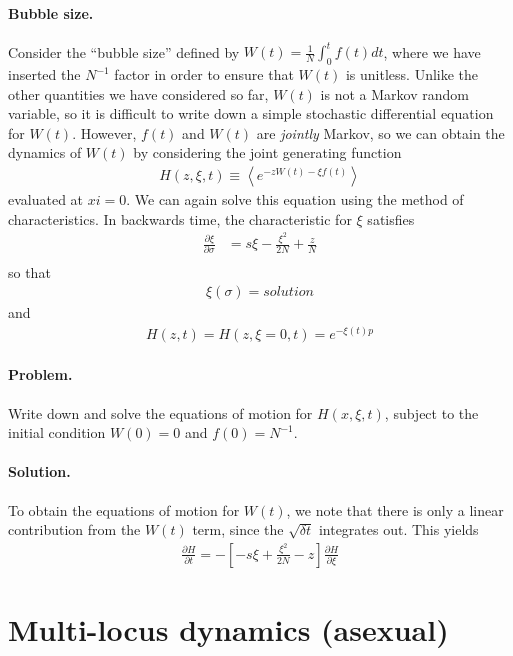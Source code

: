 \documentclass[11pt]{article}
\begin{document}
\paragraph{Bubble size.} Consider the ``bubble size'' defined by $W(t) = \frac{1}{N} \int_0^t f(t) dt$, where we have inserted the $N^{-1}$ factor in order to ensure that $W(t)$ is unitless. Unlike the other quantities we have considered so far, $W(t)$ is not a Markov random variable, so it is difficult to write down a simple stochastic differential equation for $W(t)$. However, $f(t)$ and $W(t)$ are \emph{jointly} Markov, so we can obtain the dynamics of $W(t)$ by considering the joint generating function
\begin{align}
H(z,\xi,t) \equiv \left\langle e^{-z W(t) - \xi f(t)} \right\rangle
\end{align}
evaluated at $xi=0$. We can again solve this equation using the method of characteristics. In backwards time, the characteristic for $\xi$ satisfies
\begin{align}
\frac{\partial \xi}{\partial \sigma} & = s \xi - \frac{\xi^2}{2N} + \frac{z}{N} \\
\end{align} 
so that 
\begin{align}
\xi(\sigma) = solution
\end{align}
and
\begin{align}
H(z,t) = H(z,\xi=0,t) = e^{-\xi(t) p} 
\end{align}


\paragraph{Problem.} Write down and solve the equations of motion for $H(x,\xi,t)$, subject to the initial condition $W(0)=0$ and $f(0)=N^{-1}$. 

\paragraph{Solution.} To obtain the equations of motion for $W(t)$, we note that there is only a linear contribution from the $W(t)$ term, since the $\sqrt{\delta t}$ integrates out. This yields
\begin{align}
\frac{\partial H}{\partial t} = - \left[ - s \xi + \frac{\xi^2}{2N} - z \right] \frac{\partial H}{\partial \xi}  
\end{align}   

\section{Multi-locus dynamics (asexual)}
\end{document}
